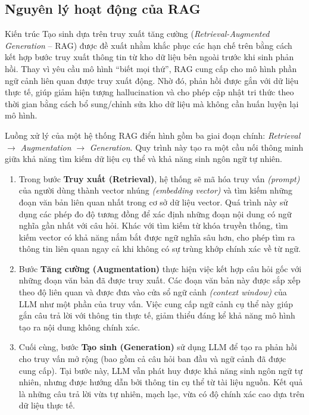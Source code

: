 \subsection{Nguyên lý hoạt động của RAG}

Kiến trúc {Tạo sinh dựa trên truy xuất tăng cường} (\emph{Retrieval-Augmented Generation} -- RAG) được đề xuất nhằm khắc phục các hạn chế trên bằng cách kết hợp bước truy xuất thông tin từ kho dữ liệu bên ngoài trước khi sinh phản hồi. Thay vì yêu cầu mô hình ``biết mọi thứ'', RAG cung cấp cho mô hình phần ngữ cảnh liên quan được truy xuất động. Nhờ đó, phản hồi được gắn với dữ liệu thực tế, giúp giảm hiện tượng hallucination và cho phép cập nhật tri thức theo thời gian bằng cách bổ sung/chỉnh sửa kho dữ liệu mà không cần huấn luyện lại mô hình.

Luồng xử lý của một hệ thống RAG điển hình gồm ba giai đoạn chính: \emph{Retrieval} \(\rightarrow\) \emph{Augmentation} \(\rightarrow\) \emph{Generation}. Quy trình này tạo ra một cầu nối thông minh giữa khả năng tìm kiếm dữ liệu cụ thể và khả năng sinh ngôn ngữ tự nhiên.

\begin{enumerate}
    \item Trong bước \textbf{Truy xuất (Retrieval)}, hệ thống sẽ mã hóa truy vấn \emph{(prompt)} của người dùng thành vector nhúng \emph{(embedding vector)} và tìm kiếm những đoạn văn bản liên quan nhất trong cơ sở dữ liệu vector. Quá trình này sử dụng các phép đo độ tương đồng để xác định những đoạn nội dung có ngữ nghĩa gần nhất với câu hỏi. Khác với tìm kiếm từ khóa truyền thống, tìm kiếm vector có khả năng nắm bắt được ngữ nghĩa sâu hơn, cho phép tìm ra thông tin liên quan ngay cả khi không có sự trùng khớp chính xác về từ ngữ.

    \item Bước \textbf{Tăng cường (Augmentation)} thực hiện việc kết hợp câu hỏi gốc với những đoạn văn bản đã được truy xuất. Các đoạn văn bản này được sắp xếp theo độ liên quan và được đưa vào {cửa sổ ngữ cảnh} \emph{(context window)} của LLM như một phần của truy vấn. Việc cung cấp ngữ cảnh cụ thể này giúp gắn câu trả lời với thông tin thực tế, giảm thiểu đáng kể khả năng mô hình tạo ra nội dung không chính xác.

    \item Cuối cùng, bước \textbf{Tạo sinh (Generation)} sử dụng LLM để tạo ra phản hồi cho truy vấn mở rộng (bao gồm cả câu hỏi ban đầu và ngữ cảnh đã được cung cấp). Tại bước này, LLM vẫn phát huy được khả năng sinh ngôn ngữ tự nhiên, nhưng được hướng dẫn bởi thông tin cụ thể từ tài liệu nguồn. Kết quả là những câu trả lời vừa tự nhiên, mạch lạc, vừa có độ chính xác cao dựa trên dữ liệu thực tế.
\end{enumerate}

